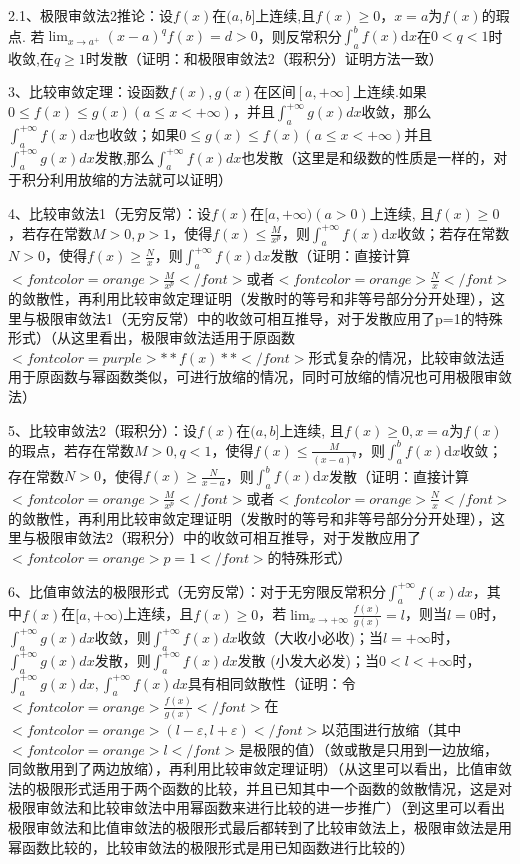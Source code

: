 2.1、极限审敛法2推论：设$ f(x) $在$ (a, b] $上连续,且$ f(x) \geqslant 0 $，$  x=a $为$ f(x) $的瑕点. 若$ \lim_{x \rightarrow a^{+}}(x-a)^{q} f(x)=d>0 $，则反常积分$ \int_{a}^{b} f(x) \mathrm{d} x $在$ 0<q<1 $时收敛,在$ q \geqslant 1 $时发散（证明：和极限审敛法2（瑕积分）证明方法一致）

3、比较审敛定理：设函数$ f(x), g(x) $在区间$ [a,+\infty] $上连续.如果$ 0 \leqslant f(x) \leqslant g(x)(a \leqslant x<+\infty) $，并且$ \int_{a}^{+\infty} g(x) d x $收敛，那么$ \int_{a}^{+\infty} f(x) \mathrm{d} x $也收敛；如果$ 0 \leq g(x) \leq f(x)(a \leq x<+\infty) $并且$ \int_{a}^{+\infty} g(x) d x $发散,那么$ \int_{a}^{+\infty} f(x) d x $也发散（这里是和级数的性质是一样的，对于积分利用放缩的方法就可以证明）

4、比较审敛法1（无穷反常）：设$ f(x) $在$ [a,+\infty)(a>0) $上连续, 且$ f(x) \geqslant 0 $，若存在常数$ M>0, p>1 $，使得$ f(x) \leqslant \frac{M}{x^{p}} $，则$ \int_{a}^{+\infty} f(x) \mathrm{d} x $收敛；若存在常数$ N>0 $，使得$ f(x) \geqslant \frac{N}{x} $，则$  \int_{a}^{+\infty} f(x) \mathrm{d} x $发散（证明：直接计算$ <font color=orange>\frac{M}{x^{p}}</font> $或者$ <font color=orange>\frac{N}{x}</font> $的敛散性，再利用比较审敛定理证明（发散时的等号和非等号部分分开处理），这里与极限审敛法1（无穷反常）中的收敛可相互推导，对于发散应用了p=1的特殊形式）（从这里看出，极限审敛法适用于原函数$ <font color=purple>**f(x)**</font> $形式复杂的情况，比较审敛法适用于原函数与幂函数类似，可进行放缩的情况，同时可放缩的情况也可用极限审敛法）

5、比较审敛法2（瑕积分）：设$ f(x) $在$ (a, b] $上连续, 且$ f(x) \geqslant 0, x=a $为$ f(x) $的瑕点，若存在常数$ M>0, q<1 $，使得$ f(x) \leqslant \frac{M}{(x-a)^{q}} $，则$ \int_{a}^{b} f(x) \mathrm{d} x $收敛；存在常数$ N>0 $，使得$ f(x) \geqslant \frac{N}{x-a} $，则$ \int_{a}^{b} f(x) \mathrm{d} x $发散（证明：直接计算$ <font color=orange>\frac{M}{x^{p}}</font> $或者$ <font color=orange>\frac{N}{x}</font> $的敛散性，再利用比较审敛定理证明（发散时的等号和非等号部分分开处理），这里与极限审敛法2（瑕积分）中的收敛可相互推导，对于发散应用了$ <font color=orange>p=1</font> $的特殊形式）

6、比值审敛法的极限形式（无穷反常）：对于无穷限反常积分$ \int_{a}^{+\infty} f(x) d x $，其中$ f(x) $在$ [{a},+\infty) $上连续，且$ f(x) \geqslant 0 $，若$ \lim_{x \rightarrow+\infty} \frac{f(x)}{g(x)}=l $，则当$ l=0 $时，$ \int_{a}^{+\infty} g(x) d x $收敛，则$ \int_{a}^{+\infty} f(x) d x $收敛（大收小必收)；当$ l=+\infty $时，$ \int_{a}^{+\infty} g(x) d x $发散，则$ \int_{a}^{+\infty} f(x) d x $发散 (小发大必发)；当$ 0<l<+\infty $时，$ \int_{a}^{+\infty} g(x) d x,\int_{a}^{+\infty} f(x) d x $具有相同敛散性（证明：令$ <font color=orange>\frac{f(x)}{g(x)}</font> $在$ <font color=orange>(l-\varepsilon,l+\varepsilon)</font> $以范围进行放缩（其中$ <font color=orange>l</font> $是极限的值）（敛或散是只用到一边放缩，同敛散用到了两边放缩），再利用比较审敛定理证明）（从这里可以看出，比值审敛法的极限形式适用于两个函数的比较，并且已知其中一个函数的敛散情况，这是对极限审敛法和比较审敛法中用幂函数来进行比较的进一步推广）（到这里可以看出极限审敛法和比值审敛法的极限形式最后都转到了比较审敛法上，极限审敛法是用幂函数比较的，比较审敛法的极限形式是用已知函数进行比较的）

